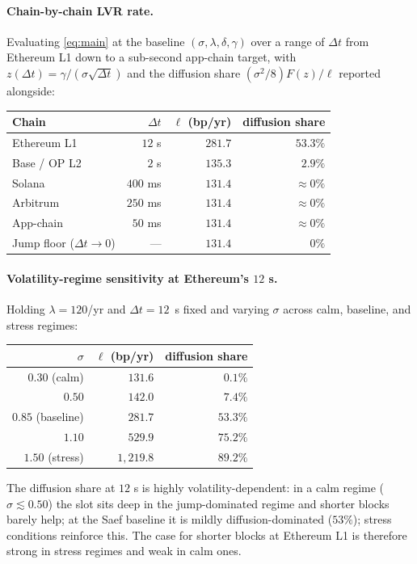 \documentclass[runningheads]{llncs}
\newcommand{\dt}{\Delta t}
\newcommand{\1}{\mathbf{1}}
\begin{document}
\paragraph{Chain-by-chain LVR rate.}
Evaluating \eqref{eq:main} at the baseline $(\sigma,\lambda,\delta,\gamma)$ over a range of $\dt$ from Ethereum L1 down to a sub-second app-chain target, with $z(\dt) = \gamma/(\sigma\sqrt{\dt})$ and the diffusion share $(\sigma^2/8)F(z)/\ell$ reported alongside:

\begin{center}
\begin{tabular}{lrrr}
\toprule
Chain & $\dt$ & $\ell$ (bp/yr) & diffusion share \\
\midrule
Ethereum L1 & $12$ s & $281.7$ & $53.3\%$ \\
Base / OP L2 & $2$ s & $135.3$ & $2.9\%$ \\
Solana & $400$ ms & $131.4$ & $\approx 0\%$ \\
Arbitrum & $250$ ms & $131.4$ & $\approx 0\%$ \\
App-chain & $50$ ms & $131.4$ & $\approx 0\%$ \\
\midrule
Jump floor ($\dt\to 0$) & --- & $131.4$ & $0\%$ \\
\bottomrule
\end{tabular}
\end{center}

\paragraph{Volatility-regime sensitivity at Ethereum's $12$ s.}
Holding $\lambda = 120$/yr and $\dt = 12$~s fixed and varying $\sigma$ across calm, baseline, and stress regimes:
\begin{center}
\begin{tabular}{rrr}
\toprule
$\sigma$ & $\ell$ (bp/yr) & diffusion share \\
\midrule
$0.30$ (calm) & $131.6$ & $0.1\%$ \\
$0.50$ & $142.0$ & $7.4\%$ \\
$0.85$ (baseline) & $281.7$ & $53.3\%$ \\
$1.10$ & $529.9$ & $75.2\%$ \\
$1.50$ (stress) & $1{,}219.8$ & $89.2\%$ \\
\bottomrule
\end{tabular}
\end{center}
The diffusion share at $12$ s is highly volatility-dependent: in a calm regime ($\sigma \lesssim 0.50$) the slot sits deep in the jump-dominated regime and shorter blocks barely help; at the Saef baseline it is mildly diffusion-dominated ($53\%$); stress conditions reinforce this. The case for shorter blocks at Ethereum L1 is therefore strong in stress regimes and weak in calm ones.
\end{document}
